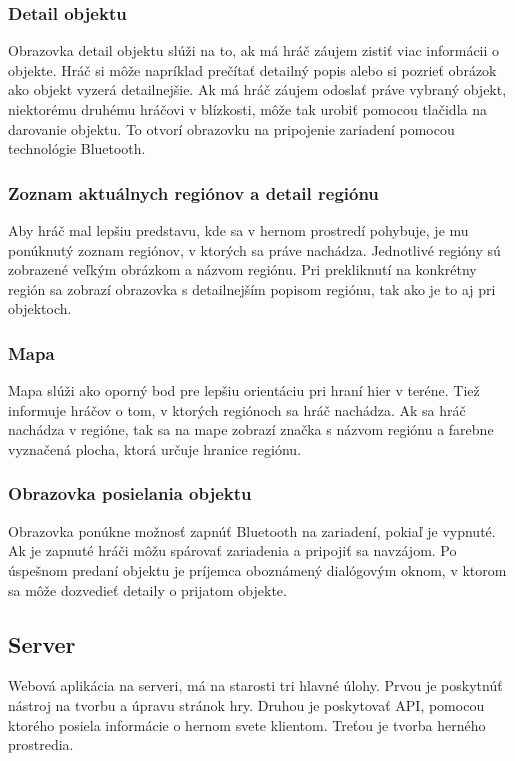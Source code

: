 \subsubsection{Detail objektu}
Obrazovka detail objektu slúži na to, ak má hráč záujem zistiť viac informácii o objekte. Hráč si môže napríklad prečítať detailný popis alebo si pozrieť obrázok ako objekt vyzerá detailnejšie. Ak má hráč záujem odoslať práve vybraný objekt, niektorému druhému hráčovi v blízkosti, môže tak urobiť pomocou tlačidla na darovanie objektu. To otvorí obrazovku na pripojenie zariadení pomocou technológie Bluetooth.

\subsubsection{Zoznam aktuálnych regiónov a detail regiónu}
Aby hráč mal lepšiu predstavu, kde sa v hernom prostredí pohybuje, je mu ponúknutý zoznam regiónov, v ktorých sa práve nachádza. Jednotlivé regióny sú zobrazené veľkým obrázkom a názvom regiónu. Pri prekliknutí na konkrétny región sa zobrazí obrazovka s detailnejším popisom regiónu, tak ako je to aj pri objektoch.

\subsubsection{Mapa}
Mapa slúži ako oporný bod  pre lepšiu orientáciu pri hraní hier v teréne. Tiež informuje hráčov o tom, v ktorých regiónoch sa hráč nachádza. Ak sa hráč nachádza v regióne, tak sa na mape zobrazí značka s názvom regiónu a farebne vyznačená plocha, ktorá určuje hranice regiónu.

\subsubsection{Obrazovka posielania objektu}
Obrazovka ponúkne možnosť zapnúť Bluetooth na zariadení, pokiaľ je vypnuté. Ak je zapnuté hráči môžu spárovať zariadenia a pripojiť sa navzájom. Po úspešnom predaní objektu je príjemca oboznámený dialógovým oknom, v ktorom sa môže dozvedieť detaily o prijatom objekte.


\subsection{Server}
Webová aplikácia na serveri, má na starosti tri hlavné úlohy. Prvou je poskytnúť nástroj na tvorbu a úpravu stránok hry. Druhou je poskytovať API, pomocou ktorého posiela informácie o hernom svete klientom. Treťou je tvorba herného prostredia.\ 

